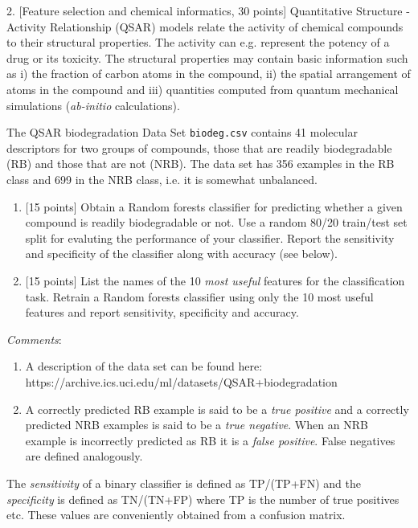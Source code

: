 \documentclass[11pt]{article}
\begin{document}
    2. {[}Feature selection and chemical informatics, 30 points{]}
Quantitative Structure - Activity Relationship (QSAR) models relate the
activity of chemical compounds to their structural properties. The
activity can e.g. represent the potency of a drug or its toxicity. The
structural properties may contain basic information such as i) the
fraction of carbon atoms in the compound, ii) the spatial arrangement of
atoms in the compound and iii) quantities computed from quantum
mechanical simulations (\emph{ab-initio} calculations).

The QSAR biodegradation Data Set \texttt{biodeg.csv} contains 41
molecular descriptors for two groups of compounds, those that are
readily biodegradable (RB) and those that are not (NRB). The data set
has 356 examples in the RB class and 699 in the NRB class, i.e. it is
somewhat unbalanced.

\begin{enumerate}
\def\labelenumi{\alph{enumi})}
\item
  {[}15 points{]} Obtain a Random forests classifier for predicting
  whether a given compound is readily biodegradable or not. Use a random
  80/20 train/test set split for evaluting the performance of your
  classifier. Report the sensitivity and specificity of the classifier
  along with accuracy (see below).
\item
  {[}15 points{]} List the names of the 10 \emph{most useful} features
  for the classification task. Retrain a Random forests classifier using
  only the 10 most useful features and report sensitivity, specificity
  and accuracy.
\end{enumerate}

\emph{Comments}:

\begin{enumerate}
\def\labelenumi{\arabic{enumi})}
\item
  A description of the data set can be found here:
  https://archive.ics.uci.edu/ml/datasets/QSAR+biodegradation
\item
  A correctly predicted RB example is said to be a \emph{true positive}
  and a correctly predicted NRB examples is said to be a \emph{true
  negative}. When an NRB example is incorrectly predicted as RB it is a
  \emph{false positive}. False negatives are defined analogously.
\end{enumerate}

The \emph{sensitivity} of a binary classifier is defined as TP/(TP+FN)
and the \emph{specificity} is defined as TN/(TN+FP) where TP is the
number of true positives etc. These values are conveniently obtained
from a confusion matrix.
\end{document}
